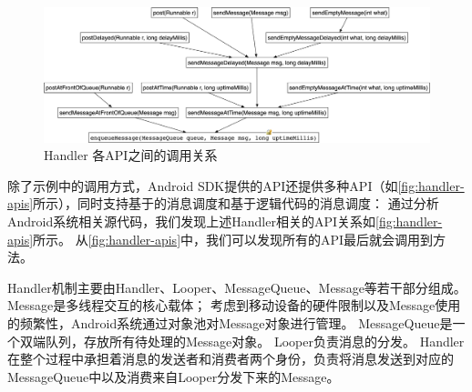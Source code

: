 


\begin{figure}[hb]
	\centering
	\includegraphics[width=\textwidth]{./Figures/Handler-apis.png}
	\caption{ Handler 各API之间的调用关系}
	\label{fig:handler-apis}
\end{figure}


除了示例中的调用方式，Android SDK提供的API\cite{HandlerA26:online}还提供多种API（如\autoref{fig:handler-apis}所示），同时支持基于的消息调度和基于逻辑代码的消息调度：
 通过分析Android系统相关源代码，我们发现上述Handler相关的API关系如\autoref{fig:handler-apis}所示。
从\autoref{fig:handler-apis}中，我们可以发现所有的API最后就会调用到方法。


Handler机制主要由Handler、Looper、MessageQueue、Message等若干部分组成。
 Message是多线程交互的核心载体；
考虑到移动设备的硬件限制以及Message使用的频繁性，Android系统通过对象池对Message对象进行管理。
MessageQueue是一个双端队列，存放所有待处理的Message对象。
Looper负责消息的分发。
Handler在整个过程中承担着消息的发送者和消费者两个身份，负责将消息发送到对应的MessageQueue中以及消费来自Looper分发下来的Message。

